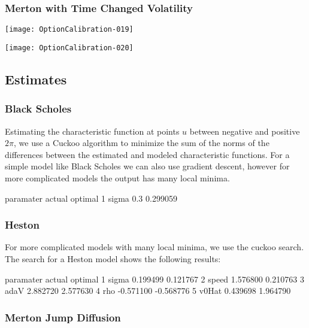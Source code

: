 \documentclass{article}
\begin{document}
\subsubsection{Merton with Time Changed Volatility}
\texttt{[image: OptionCalibration-019]}

\texttt{[image: OptionCalibration-020]}

\subsection{Estimates}

\subsubsection{Black Scholes}
Estimating the characteristic function at points \(u\) between negative and positive \(2\pi\), we use a Cuckoo algorithm to minimize the sum of the norms of the differences between the estimated and modeled characteristic functions.  For a simple model like Black Scholes we can also use gradient descent, however for more complicated models the output has many local minima.  

\begin{Schunk}
\begin{Soutput}
  paramater actual  optimal
1     sigma    0.3 0.299059
\end{Soutput}
\end{Schunk}

\subsubsection{Heston}

For more complicated models with many local minima, we use the cuckoo search. The search for a Heston model shows the following results:

\begin{Schunk}
\begin{Soutput}
  paramater    actual   optimal
1     sigma  0.199499  0.121767
2     speed  1.576800  0.210763
3      adaV  2.882720  2.577630
4       rho -0.571100 -0.568776
5     v0Hat  0.439698  1.964790
\end{Soutput}
\end{Schunk}


\subsubsection{Merton Jump Diffusion}
\end{document}
